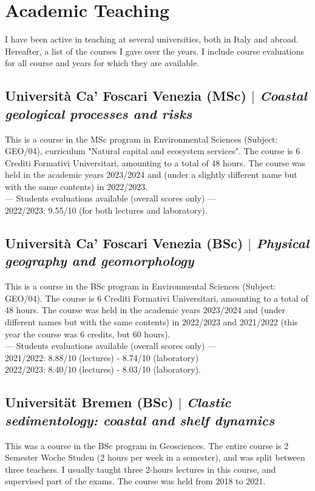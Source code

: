 \documentclass[11pt]{article}
\begin{document}
\newpage
\section{Academic Teaching}
{\normalfont I have been active in teaching at several universities, both in Italy and abroad. Hereafter, a list of the courses I gave over the years. I include course evaluations for all course and years for which they are available.}\\
\bigskip
\subsection{Università Ca' Foscari Venezia (MSc) $|$ {\normalfont\textit{Coastal geological processes and risks}}}
{\footnotesize This is a course in the MSc program in Environmental Sciences (Subject: GEO/04), curriculum "Natural capital and ecosystem services". The course is 6 Crediti Formativi Universitari, amounting to a total of 48 hours. The course was held in the academic years 2023/2024 and (under a slightly different name but with the same contents) in 2022/2023. 
\\--- Students evaluations available (overall scores only) --- \\
2022/2023: 9.55/10 (for both lectures and laboratory).}
\bigskip

\subsection{Università Ca' Foscari Venezia (BSc) $|$ {\normalfont\textit{Physical geography and geomorphology}}}
{\footnotesize This is a course in the BSc program in Environmental Sciences (Subject: GEO/04). The course is 6 Crediti Formativi Universitari, amounting to a total of 48 hours. The course was held in the academic years 2023/2024 and (under different names but with the same contents) in 2022/2023 and 2021/2022 (this year the course was 6 credits, but 60 hours). 
\\--- Students evaluations available (overall scores only) --- \\
2021/2022: 8.88/10 (lectures) - 8.74/10 (laboratory)\\
2022/2023: 8.40/10 (lectures) - 8.03/10 (laboratory).}
\bigskip

\subsection{Universität Bremen (BSc) $|$ {\normalfont\textit{Clastic sedimentology: coastal and shelf dynamics}}}
{\footnotesize This was a course in the BSc program in Geosciences. The entire course is 2 Semester Woche Studen (2 hours per week in a semester), and was split between three teachers. I usually taught three 2-hours lectures in this course, and supervised part of the exams. The course was held from 2018 to 2021.}
\bigskip
\end{document}

